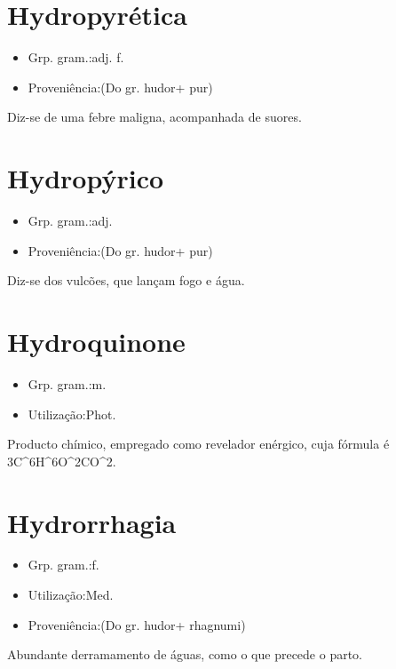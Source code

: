 \documentclass{article}
\begin{document}
\section{Hydropyrética}
\begin{itemize}
\item {Grp. gram.:adj. f.}
\end{itemize}
\begin{itemize}
\item {Proveniência:(Do gr. \textunderscore hudor\textunderscore  + \textunderscore pur\textunderscore )}
\end{itemize}
Diz-se de uma febre maligna, acompanhada de suores.
\section{Hydropýrico}
\begin{itemize}
\item {Grp. gram.:adj.}
\end{itemize}
\begin{itemize}
\item {Proveniência:(Do gr. \textunderscore hudor\textunderscore  + \textunderscore pur\textunderscore )}
\end{itemize}
Diz-se dos vulcões, que lançam fogo e água.
\section{Hydroquinone}
\begin{itemize}
\item {Grp. gram.:m.}
\end{itemize}
\begin{itemize}
\item {Utilização:Phot.}
\end{itemize}
Producto chímico, empregado como revelador enérgico, cuja fórmula é 3C^{6}H^{6}O^{2}CO^{2}.
\section{Hydrorrhagia}
\begin{itemize}
\item {Grp. gram.:f.}
\end{itemize}
\begin{itemize}
\item {Utilização:Med.}
\end{itemize}
\begin{itemize}
\item {Proveniência:(Do gr. \textunderscore hudor\textunderscore  + \textunderscore rhagnumi\textunderscore )}
\end{itemize}
Abundante derramamento de águas, como o que precede o parto.
\end{document}
